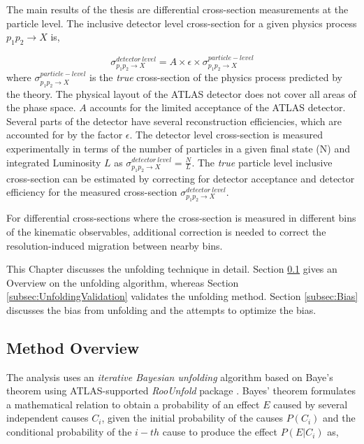 The main results of the thesis are differential cross-section measurements at the particle level. The inclusive detector level cross-section for a given physics process $p_{1}p_{2}\rightarrow X$ is, 

\begin{equation}
    \sigma ^{detector~level}_{p_{1}p_{2}\rightarrow X} = A \times \epsilon \times \sigma ^{particle-level}_{p_{1}p_{2}\rightarrow X}
    \label{eqn:InclusiveXS}
\end{equation}
where $\sigma ^{particle-level}_{p_{1}p_{2}\rightarrow X}$ is the \textit{true} cross-section of the physics process predicted by the theory. The physical layout of the ATLAS detector does not cover all areas of the phase space. $A$ accounts for the limited acceptance of the ATLAS detector. Several parts of the detector have several reconstruction efficiencies, which are accounted for by the factor $\epsilon$. The detector level cross-section is measured experimentally in terms of the number of particles in a given final state (N) and integrated Luminosity $L$ as $\sigma ^{detector~level}_{p_{1}p_{2}\rightarrow X} = \frac{N}{L}$. The \textit{true} particle level inclusive cross-section can be estimated by correcting for detector acceptance and detector efficiency for the measured cross-section $\sigma ^{detector~level}_{p_{1}p_{2}\rightarrow X}$.

For differential cross-sections where the cross-section is measured in different bins of the kinematic observables, additional correction is needed to correct the resolution-induced migration between nearby bins. 

This Chapter discusses the unfolding technique in detail. Section \ref{subsec:UnfoldingOverview} gives an Overview on the unfolding algorithm, whereas Section \ref{subsec:UnfoldingValidation} validates the unfolding method. Section \ref{subsec:Bias} discusses the bias from unfolding and the attempts to optimize the bias.  

\subsection{Method Overview}
\label{subsec:UnfoldingOverview}
The analysis uses an \textit{iterative Bayesian unfolding} algorithm based on Baye's theorem \cite{BayesianUnfolding} \cite{Improved_BayesianUnfolding} using ATLAS-supported \textit{RooUnfold} package \cite{RooUnfold}. Bayes' theorem formulates a mathematical relation to obtain a probability of an effect $E$ caused by several independent causes $C_{i}$, given the initial probability of the causes $P(C_{i})$ and the conditional probability of the $i-th$ cause to produce the effect $P(E|C_{i})$ as, 

